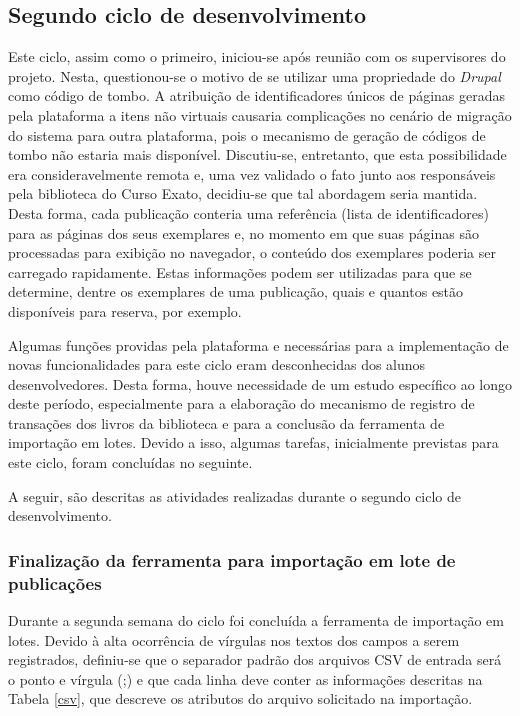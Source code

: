 \documentclass[a4paper]{article}
\begin{document}
\subsection{Segundo ciclo de desenvolvimento}
Este ciclo, assim como o primeiro, iniciou-se após reunião com os supervisores do projeto. Nesta, questionou-se o motivo de se utilizar uma propriedade do \textit{Drupal} como código de tombo. A atribuição de identificadores únicos de páginas geradas pela plataforma a itens não virtuais causaria complicações no cenário de migração do sistema para outra plataforma, pois o mecanismo de geração de códigos de tombo não estaria mais disponível. Discutiu-se, entretanto, que esta possibilidade era consideravelmente remota e, uma vez validado o fato junto aos responsáveis pela biblioteca do Curso Exato, decidiu-se que tal abordagem seria mantida. Desta forma, cada publicação conteria uma referência (lista de identificadores) para as páginas dos seus exemplares e, no momento em que suas páginas são processadas para exibição no navegador, o conteúdo dos exemplares poderia ser carregado rapidamente. Estas informações podem ser utilizadas para que se determine, dentre os exemplares de uma publicação, quais e quantos estão disponíveis para reserva, por exemplo.

Algumas funções providas pela plataforma e necessárias para a implementação de novas funcionalidades para este ciclo eram desconhecidas dos alunos desenvolvedores. Desta forma, houve necessidade de um estudo específico ao longo deste período, especialmente para a elaboração do mecanismo de registro de transações dos livros da biblioteca e para a conclusão da ferramenta de importação em lotes. Devido a isso, algumas tarefas, inicialmente previstas para este ciclo, foram concluídas no seguinte.

A seguir, são descritas as atividades realizadas durante o segundo ciclo de desenvolvimento.


\subsubsection{Finalização da ferramenta para importação em lote de publicações}

Durante a segunda semana do ciclo foi concluída a ferramenta de importação em lotes. Devido à alta ocorrência de vírgulas nos textos dos campos a serem registrados, definiu-se que o separador padrão dos arquivos CSV de entrada será o ponto e vírgula (;) e que cada linha deve conter as informações descritas na Tabela \ref{csv}, que descreve os atributos do arquivo solicitado na importação.
\end{document}
